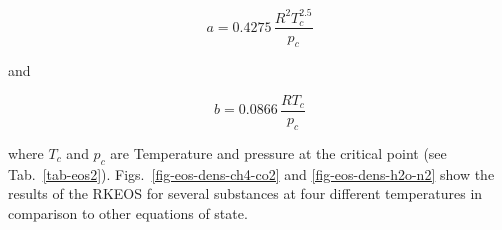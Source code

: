 \begin{equation}
a=0.4275\,\frac{R^2 T_c^{2.5}}{p_c}
\label{eq-rkeos_a}
\end{equation}

and

\begin{equation}
b= 0.0866\,\frac{RT_c}{p_c}
\label{eq-rkeos_b}
\end{equation}

where $T_c$ and $p_c$ are Temperature and pressure at the critical point (see Tab.~\ref{tab-eos2}). Figs.~\ref{fig-eos-dens-ch4-co2} and \ref{fig-eos-dens-h2o-n2} show the results of the RKEOS for several substances at four different temperatures in comparison to other equations of state.




